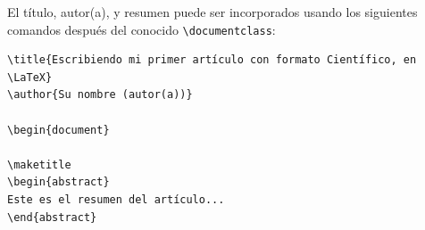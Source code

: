 \documentclass[11pt]{exam}
\begin{document}
\begin{questions}
El título, autor(a), y resumen puede ser incorporados usando los siguientes comandos después del conocido \verb|\documentclass|:

\begin{verbatim}
\title{Escribiendo mi primer artículo con formato Científico, en \LaTeX}
\author{Su nombre (autor(a))}

\begin{document}

\maketitle
\begin{abstract}
Este es el resumen del artículo...
\end{abstract}
\end{verbatim}
\end{questions}
\end{document}
